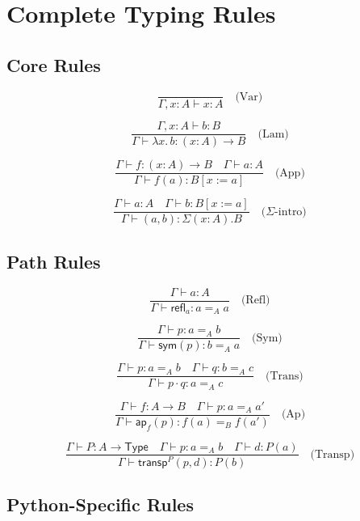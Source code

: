 \documentclass[11pt,a4paper]{report}
\theoremstyle{definition}
\theoremstyle{plain}
\newcommand{\Type}{\mathsf{Type}}
\newcommand{\transp}{\mathsf{transp}}
\newcommand{\Refl}{\mathsf{refl}}
\newcommand{\sym}{\mathsf{sym}}
\newcommand{\ap}{\mathsf{ap}}
\begin{document}

\appendix

\chapter{Complete Typing Rules}
\label{app:typing-rules}

\section{Core Rules}

\[
  \frac{}{\Gamma, x : A \vdash x : A} \quad \text{(Var)}
\]

\[
  \frac{\Gamma, x : A \vdash b : B}{\Gamma \vdash \lambda x.\, b : (x : A) \to B} \quad \text{(Lam)}
\]

\[
  \frac{\Gamma \vdash f : (x : A) \to B \quad \Gamma \vdash a : A}
       {\Gamma \vdash f(a) : B[x := a]} \quad \text{(App)}
\]

\[
  \frac{\Gamma \vdash a : A \quad \Gamma \vdash b : B[x := a]}
       {\Gamma \vdash (a, b) : \Sigma(x : A). B} \quad \text{($\Sigma$-intro)}
\]

\section{Path Rules}

\[
  \frac{\Gamma \vdash a : A}{\Gamma \vdash \Refl_a : a =_A a} \quad \text{(Refl)}
\]

\[
  \frac{\Gamma \vdash p : a =_A b}{\Gamma \vdash \sym(p) : b =_A a} \quad \text{(Sym)}
\]

\[
  \frac{\Gamma \vdash p : a =_A b \quad \Gamma \vdash q : b =_A c}
       {\Gamma \vdash p \cdot q : a =_A c} \quad \text{(Trans)}
\]

\[
  \frac{\Gamma \vdash f : A \to B \quad \Gamma \vdash p : a =_A a'}
       {\Gamma \vdash \ap_f(p) : f(a) =_B f(a')} \quad \text{(Ap)}
\]

\[
  \frac{\Gamma \vdash P : A \to \Type \quad \Gamma \vdash p : a =_A b \quad \Gamma \vdash d : P(a)}
       {\Gamma \vdash \transp^P(p, d) : P(b)} \quad \text{(Transp)}
\]

\section{Python-Specific Rules}
\end{document}
